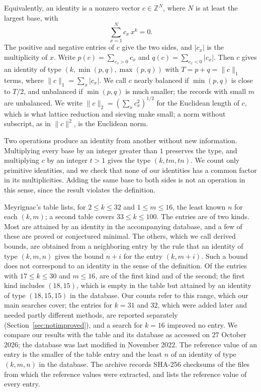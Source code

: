 \documentclass[11pt]{amsart}
\theoremstyle{definition}
\theoremstyle{remark}
\newcommand{\Z}{\mathbb{Z}}
\begin{document}
Equivalently, an identity is a nonzero vector $c\in\Z^N$, where $N$ is at least the largest
base, with
\begin{equation}\label{eq:relation}
\sum_{x=1}^{N} c_x\, x^k = 0.
\end{equation}
The positive and negative entries of $c$ give the two sides, and $|c_x|$ is the multiplicity
of $x$. Write $p(c)=\sum_{c_x>0}c_x$ and $q(c)=\sum_{c_x<0}|c_x|$. Then $c$ gives an identity
of type $(k,\min(p,q),\max(p,q))$ with $T=p+q=\|c\|_1$ terms, where
$\|c\|_1=\sum_x|c_x|$. We call $c$ nearly balanced if $\min(p,q)$ is close to $T/2$, and
unbalanced if $\min(p,q)$ is much smaller; the records with small $m$ are unbalanced. We write
$\|c\|_2=(\sum_xc_x^2)^{1/2}$ for the Euclidean length of $c$, which is what lattice reduction
and sieving make small; a norm without subscript, as in $\|c\|^2$, is the Euclidean norm.

Two operations produce an identity from another without new information. Multiplying every
base by an integer greater than $1$ preserves the type, and multiplying $c$ by an integer $t>1$ gives the type
$(k,tm,tn)$. We count only primitive identities, and we check that none of our identities
has a common factor in its multiplicities. Adding the same base to both sides is not an
operation in this sense, since the result violates the definition.

Meyrignac's table \cite{MeyrignacEuler} lists, for $2\le k\le32$ and $1\le m\le16$, the least
known $n$ for each $(k,m)$; a second table covers $33\le k\le100$. The entries are of two
kinds. Most are attained by an identity in the accompanying database, and a few of these are
proved or conjectured minimal. The others, which we call derived bounds, are obtained from a
neighboring entry by the rule that an identity of type $(k,m,n)$ gives the bound $n+i$ for the
entry $(k,m+i)$. Such a bound does not correspond to an identity in the sense of the
definition. Of the \NumCells{} entries with $17\le k\le30$ and $m\le16$, \NumCellsIdent{} are of
the first kind and \NumCellsDerived{} of the second; the first kind includes $(18,15)$, which is
empty in the table but attained by an identity of type $(18,15,15)$ in the database. Our counts
refer to this range, which our main searches cover; the entries for $k=31$ and $32$, which were
added later and needed partly different methods, are reported separately
(Section~\ref{sec:notimproved}), and a search for $k=16$ improved no entry. We compare our
results with the table and its database as accessed on 27 October 2026; the database was last
modified in November 2022. The reference value of an entry is the smaller of the table entry
and the least $n$ of an identity of type $(k,m,n)$ in the database. The archive records SHA-256
checksums of the files from which the reference values were extracted, and lists the reference
value of every entry.
\end{document}
